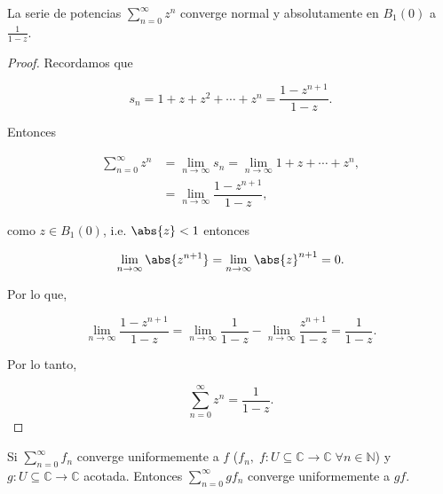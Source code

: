 \documentclass[../main.tex]{subfiles}
\begin{document}
\pagebreak
{}
\begin{lemma}[1]\label{lemma:lem1}
    La serie de potencias \(\sum_{n = 0}^{\infty}z^{n}\) converge normal y absolutamente
    en \(B_{1}(0)\) a \(\tfrac{1}{1 - z}\).
\end{lemma}

\begin{proof}
    Recordamos que

    \begin{equation*}
        s_{n} = 1 + z + z^{2} + \cdots + z^{n} = \dfrac{1 - z^{n + 1}}{1 - z}.
    \end{equation*}

    Entonces

    \begin{align*}
        \sum_{n = 0}^{\infty}z^{n} &= \lim_{n \to \infty} s_{n} = \lim_{n \to
        \infty} 1 + z +
        \cdots + z^{n},\\
        &= \lim_{n \to \infty} \dfrac{1 - z^{n + 1}}{1 - z},
    \end{align*}

    como \(z\in B_{1}(0)\), i.e. \(\abs{z} < 1\) entonces

    \begin{equation*}
        \lim_{n \to \infty} \abs{z^{n + 1}} = \lim_{n \to \infty} \abs{z}^{n + 1} = 0.
    \end{equation*}

    Por lo que,

    \begin{equation*}
        \lim_{n \to \infty} \dfrac{1 - z^{n + 1}}{1 - z} = \lim_{n \to
        \infty} \dfrac{1}{1 -
        z} - \lim_{n \to \infty} \dfrac{z^{n + 1}}{1 - z} = \dfrac{1}{1 - z}.
    \end{equation*}

    Por lo tanto,

    \begin{equation*}
        \sum_{n = 0}^{\infty}z^{n} = \dfrac{1}{1 - z}.
    \end{equation*}
\end{proof}

\begin{lemma}[2]\label{lemma:lem2}
    Si \(\sum_{n = 0}^{\infty}f_{n}\) converge uniformemente a \(f\) (\(f_{n},\; f
    \colon U \subseteq \mathbb{C} \to \mathbb{C}\; \forall n\in \mathbb{N}\)) y \(g
    \colon U \subseteq \mathbb{C} \to \mathbb{C}\) acotada. Entonces \(\sum_{n =
    0}^{\infty}g f_{n}\) converge uniformemente a \(gf\).
\end{lemma}
\end{document}
